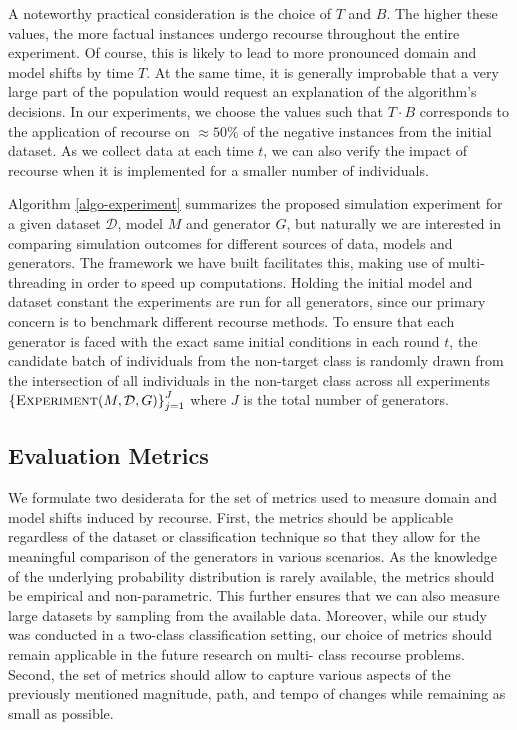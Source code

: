 \documentclass[conference,final,]{IEEEtran}
\begin{document}
A noteworthy practical consideration is the choice of \(T\) and \(B\). The higher these values, the more factual instances undergo recourse throughout the entire experiment. Of course, this is likely to lead to more pronounced domain and model shifts by time \(T\). At the same time, it is generally improbable that a very large part of the population would request an explanation of the algorithm's decisions. In our experiments, we choose the values such that \(T \cdot B\) corresponds to the application of recourse on \(\approx50\%\) of the negative instances from the initial dataset. As we collect data at each time \(t\), we can also verify the impact of recourse when it is implemented for a smaller number of individuals.

Algorithm \ref{algo-experiment} summarizes the proposed simulation experiment for a given dataset \(\mathcal{D}\), model \(M\) and generator \(G\), but naturally we are interested in comparing simulation outcomes for different sources of data, models and generators. The framework we have built facilitates this, making use of multi-threading in order to speed up computations. Holding the initial model and dataset constant the experiments are run for all generators, since our primary concern is to benchmark different recourse methods. To ensure that each generator is faced with the exact same initial conditions in each round \(t\), the candidate batch of individuals from the non-target class is randomly drawn from the intersection of all individuals in the non-target class across all experiments \(\left\{\textsc{Experiment}(M,\mathcal{D},G)\right\}_{j=1}^J\) where \(J\) is the total number of generators.

\hypertarget{method-2-metrics}{%
\subsection{Evaluation Metrics}\label{method-2-metrics}}

We formulate two desiderata for the set of metrics used to measure domain and model shifts induced by recourse. First, the metrics should be applicable regardless of the dataset or classification technique so that they allow for the meaningful comparison of the generators in various scenarios. As the knowledge of the underlying probability distribution is rarely available, the metrics should be empirical and non-parametric. This further ensures that we can also measure large datasets by sampling from the available data. Moreover, while our study was conducted in a two-class classification setting, our choice of metrics should remain applicable in the future research on multi- class recourse problems. Second, the set of metrics should allow to capture various aspects of the previously mentioned magnitude, path, and tempo of changes while remaining as small as possible.
\end{document}
